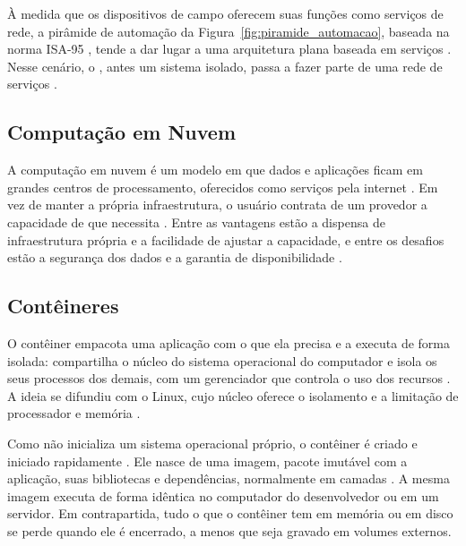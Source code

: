 \par À medida que os dispositivos de campo oferecem suas funções como serviços de rede, a pirâmide de automação da Figura~\ref{fig:piramide_automacao}, baseada na norma ISA-95 \cite{ISA95_2000_ENTERPRISE_CONTROL}, tende a dar lugar a uma arquitetura plana baseada em serviços \cite{COLOMBO2014_STATE_ART_AUTOMATION}. Nesse cenário, o , antes um sistema isolado, passa a fazer parte de uma rede de serviços \cite{YADAV2020_SCADA_ARCHITECTURE_REVIEW,BIGHETI2020}.

\subsection{Computação em Nuvem}

\par A computação em nuvem é um modelo em que dados e aplicações ficam em grandes centros de processamento, oferecidos como serviços pela internet \cite{HENRIQUES2010_CLOUD_COMPUTING_TCC}. Em vez de manter a própria infraestrutura, o usuário contrata de um provedor a capacidade de que necessita \cite{PEDROSA2011_COMPUTACAO_NUVEM}. Entre as vantagens estão a dispensa de infraestrutura própria e a facilidade de ajustar a capacidade, e entre os desafios estão a segurança dos dados e a garantia de disponibilidade \cite{HENRIQUES2010_CLOUD_COMPUTING_TCC,PEDROSA2011_COMPUTACAO_NUVEM}.

\subsection{Contêineres}

\par O contêiner empacota uma aplicação com o que ela precisa e a executa de forma isolada: compartilha o núcleo do sistema operacional do computador e isola os seus processos dos demais, com um gerenciador que controla o uso dos recursos \cite{NETTO2017_COORDENACAO_CONTAINERS_KUBERNETES}. A ideia se difundiu com o Linux, cujo núcleo oferece o isolamento e a limitação de processador e memória \cite{DOCKER_DOCS}.

\par Como não inicializa um sistema operacional próprio, o contêiner é criado e iniciado rapidamente \cite{NETTO2017_COORDENACAO_CONTAINERS_KUBERNETES}. Ele nasce de uma imagem, pacote imutável com a aplicação, suas bibliotecas e dependências, normalmente em camadas \cite{NETTO2016_STATE_MACHINE_REPLICATION_KUBERNETES}. A mesma imagem executa de forma idêntica no computador do desenvolvedor ou em um servidor. Em contrapartida, tudo o que o contêiner tem em memória ou em disco se perde quando ele é encerrado, a menos que seja gravado em volumes externos.

